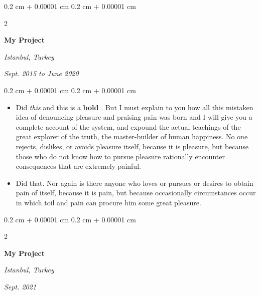 \documentclass[10pt, letterpaper]{article}
\newenvironment{highlights}{
    \begin{itemize}[
        topsep=0.10 cm,
        parsep=0.10 cm,
        partopsep=0pt,
        itemsep=0pt,
        leftmargin=0.4 cm + 10pt
    ]
}{
    \end{itemize}
} %
\newenvironment{onecolentry}{
    \begin{adjustwidth}{
        0.2 cm + 0.00001 cm
    }{
        0.2 cm + 0.00001 cm
    }
}{
    \end{adjustwidth}
} %
\newenvironment{twocolentry}[2][]{
    \onecolentry
    \def\secondColumn{#2}
    \setcolumnwidth{\fill, 4.5 cm}
    \begin{paracol}{2}
}{
    \switchcolumn \raggedleft \secondColumn
    \end{paracol}
    \endonecolentry
} %
\let\hrefWithoutArrow\href
\renewcommand{\href}[2]{\hrefWithoutArrow{#1}{\mbox{\ifthenelse{\equal{#2}{}}{ }{#2 }\raisebox{.15ex}{\footnotesize \faExternalLink*}}}}
\begin{document}
        \vspace{0.2 cm-3px}

        \begin{twocolentry}{
        \textit{Istanbul, Turkey}    
            
        \textit{Sept. 2015 to June 2020}}
            \textbf{My Project}
        \end{twocolentry}

        \vspace{0.10 cm-3px}
        \begin{onecolentry}
            \begin{highlights}
                \item Did \textit{this} and this is a \textbf{bold} \href{https://example.com}{link}. But I must explain to you how all this mistaken idea of denouncing pleasure and praising pain was born and I will give you a complete account of the system, and expound the actual teachings of the great explorer of the truth, the master-builder of human happiness. No one rejects, dislikes, or avoids pleasure itself, because it is pleasure, but because those who do not know how to pursue pleasure rationally encounter consequences that are extremely painful.
                \item Did that. Nor again is there anyone who loves or pursues or desires to obtain pain of itself, because it is pain, but because occasionally circumstances occur in which toil and pain can procure him some great pleasure.
            \end{highlights}
        \end{onecolentry}


        \vspace{0.2 cm-3px}

        \begin{twocolentry}{
        \textit{Istanbul, Turkey}    
            
        \textit{Sept. 2021}}
            \textbf{My Project}
        \end{twocolentry}
\end{document}
